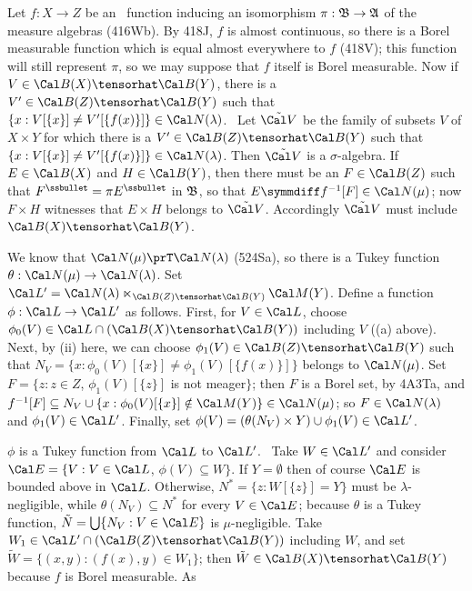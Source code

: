 { Let $f:X\to Z$ be an \imp\ function inducing an
isomorphism $\pi:\frak B\to\frak A$ of the measure algebras (416Wb).
By 418J, $f$ is almost
continuous, so there is a Borel measurable function which is equal
almost everywhere to $f$ (418V\Latereditions);
this function will still represent $\pi$, so
we may suppose that $f$ itself is Borel
measurable.   Now if $V\in\Cal B(X)\tensorhat\Cal B(Y)$, there is a
$V'\in\Cal B(Z)\tensorhat\Cal B(Y)$ such that
$\{x:V[\{x\}]\ne V'[\{f(x)\}]\}\in\Cal N(\lambda)$.
\Prf\ Let $\tilde{\Cal V}$ be the family of subsets $V$ of $X\times Y$
for which there is a $V'\in\Cal B(Z)\tensorhat\Cal B(Y)$ such that
$\{x:V[\{x\}]\ne V'[\{f(x)\}]\}\in\Cal N(\lambda)$.
Then $\tilde{\Cal V}$ is a $\sigma$-algebra.   If $E\in\Cal B(X)$ and
$H\in\Cal B(Y)$,
then there must be an $F\in\Cal B(Z)$ such that
$F^{\ssbullet}=\pi E^{\ssbullet}$ in $\frak B$, so that
$E\symmdiff f^{-1}[F]\in\Cal N(\mu)$;  now $F\times H$ witnesses that
$E\times H$
belongs to $\tilde{\Cal V}$.   Accordingly $\tilde{\Cal V}$ must include
$\Cal B(X)\tensorhat\Cal B(Y)$.\ \Qed

\medskip

 We know that $\Cal N(\mu)\prT\Cal N(\lambda)$
(524Sa), so there is a Tukey function
$\theta:\Cal N(\mu)\to\Cal N(\lambda)$.   Set
$\Cal L'=\Cal N(\lambda)\ltimes_{\Cal B(Z)\tensorhat\Cal B(Y)}\Cal M(Y)$.
Define a function $\phi:\Cal L\to\Cal L'$ as
follows.   First, for $V\in\Cal L$, choose
$\phi_0(V)\in\Cal L\cap(\Cal B(X)\tensorhat\Cal B(Y))$ including $V$
((a) above).   Next, by (ii) here, we can
choose $\phi_1(V)\in\Cal B(Z)\tensorhat\Cal B(Y)$
such that $N_V=\{x:\phi_0(V)[\{x\}]\ne\phi_1(V)[\{f(x)\}]\}$ belongs to
$\Cal N(\mu)$.   Set
$F=\{z:z\in Z$, $\phi_1(V)[\{z\}]$ is not meager$\}$;
then $F$ is a Borel set, by 4A3Ta, and
$f^{-1}[F]\subseteq N_V\cup\{x:\phi_0(V)[\{x\}]\notin\Cal M(Y)\}\in\Cal N(\mu)$;
so $F\in\Cal N(\lambda)$ and $\phi_1(V)\in\Cal L'$.
Finally, set
$\phi(V)=(\theta(N_V)\times Y)\cup\phi_1(V)\in\Cal L'$.

$\phi$ is a Tukey function from $\Cal L$ to $\Cal L'$.   \Prf\ Take
$W\in\Cal L'$ and consider $\Cal E=\{V:V\in\Cal L$, $\phi(V)\subseteq W\}$.
If $Y=\emptyset$ then of course $\Cal E$ is bounded above in $\Cal L$.
Otherwise, $N^*=\{z:W[\{z\}]=Y\}$ must be $\lambda$-negligible, while
$\theta(N_V)\subseteq N^*$ for every $V\in\Cal E$;
because $\theta$ is a
Tukey function, $\tilde N=\bigcup\{N_V:V\in\Cal E\}$ is $\mu$-negligible.
Take $W_1\in\Cal L'\cap(\Cal B(Z)\tensorhat\Cal B(Y))$ including $W$,
and set $\tilde W=\{(x,y):(f(x),y)\in W_1\}$;
then $\tilde W\in\Cal B(X)\tensorhat\Cal B(Y)$ because $f$ is Borel
measurable.   As

}
